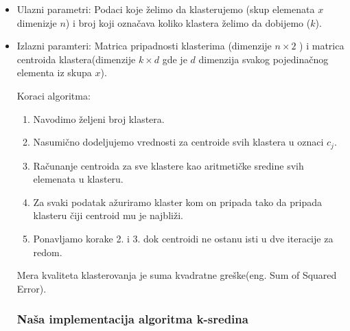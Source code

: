 \documentclass{article}
\begin{document}
\begin{itemize}

\item Ulazni parametri: Podaci koje \v{z}elimo da klasterujemo (skup elemenata $x$ dimenizje $n$) i broj koji ozna\v{c}ava koliko klastera \v{z}elimo da dobijemo ($k$).
\item Izlazni paramteri: Matrica pripadnosti klasterima (dimenzije $n \times 2$ ) i matrica centroida klastera(dimenzije $k \times d$ gde je $d$ dimenzija svakog pojedina\v{c}nog elementa iz skupa $x$).

Koraci algoritma:

\begin{enumerate}

\item Navodimo \v{z}eljeni broj klastera.
\item Nasumi\v{c}no dodeljujemo vrednosti za centroide svih klastera u oznaci $c_j$. 
\item Ra\v{c}unanje centroida za sve klastere kao aritmeti\v{c}ke sredine svih elemenata u klasteru.
\item Za svaki podatak a\v{z}uriramo klaster kom on pripada tako da pripada klasteru \v{c}iji centroid mu je najbli\v{z}i.
\item Ponavljamo korake 2. i 3. dok centroidi ne ostanu isti u dve iteracije za redom.

\end{enumerate}

Mera kvaliteta klasterovanja je suma kvadratne gre\v{s}ke(eng. {\selectfont Sum of Squared Error}).

\subsubsection{\selectfont Na\v{s}a implementacija algoritma k-sredina}


\end{itemize}
\end{document}
